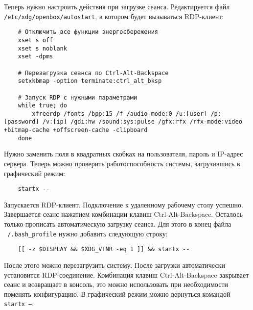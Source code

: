 Теперь нужно настроить действия при загрузке сеанса. Редактируется файл
\texttt{/etc/xdg/openbox/autostart}, в котором будет вызываться RDP-клиент:
\begin{verbatim}
    # Отключить все функции энергосбережения
    xset s off
    xset s noblank
    xset -dpms

    # Перезагрузка сеанса по Ctrl-Alt-Backspace
    setxkbmap -option terminate:ctrl_alt_bksp

    # Запуск RDP с нужными параметрами
    while true; do
        xfreerdp /fonts /bpp:15 /f /audio-mode:0 /u:[user] /p:[password] /v:[ip] /gdi:hw /sound:sys:pulse /gfx:rfx /rfx-mode:video +bitmap-cache +offscreen-cache -clipboard
    done
\end{verbatim}

Нужно заменить поля в квадратных скобках на пользователя, пароль и IP-адрес сервера.
Теперь можно проверить работоспособность системы, загрузившись в графический режим:

\begin{verbatim}
    startx --
\end{verbatim}

Запускается RDP-клиент. Подключение к удаленному рабочему столу успешно. Завершается
сеанс нажатием комбинации клавиш Ctrl-Alt-Backspace. Осталось только прописать
автоматическую загрузку сеанса. Для этого в конец файла \texttt{~/.bash\_profile} нужно
добавить следующую строку:

\begin{verbatim}
    [[ -z $DISPLAY && $XDG_VTNR -eq 1 ]] && startx --
\end{verbatim}

После этого можно перезагрузить систему. После загрузки автоматически установится
RDP-соединение. Комбинация клавиш Ctrl-Alt-Backspace закрывает сеанс и возвращает в
консоль, это можно использовать при необходимости поменять конфигурацию. В графический
режим можно вернуться командой \texttt{startx --}.

